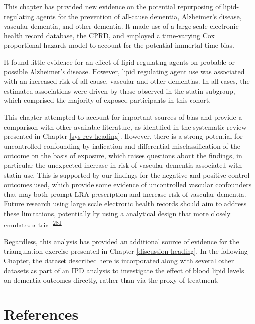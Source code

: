 \documentclass[a4paper, twoside]{templates/ociamthesis}
\begin{document}
This chapter has provided new evidence on the potential repurposing of lipid-regulating agents for the prevention of all-cause dementia, Alzheimer's disease, vascular dementia, and other dementia. It made use of a large scale electronic health record database, the CPRD, and employed a time-varying Cox proportional hazards model to account for the potential immortal time bias.

It found little evidence for an effect of lipid-regulating agents on probable or possible Alzheimer's disease. However, lipid regulating agent use was associated with an increased risk of all-cause, vascular and other dementias. In all cases, the estimated associations were driven by those observed in the statin subgroup, which comprised the majority of exposed participants in this cohort.

This chapter attempted to account for important sources of bias and provide a comparison with other available literature, as identified in the systematic review presented in Chapter \ref{sys-rev-heading}. However, there is a strong potential for uncontrolled confounding by indication and differential misclassification of the outcome on the basis of exposure, which raises questions about the findings, in particular the unexpected increase in risk of vascular dementia associated with statin use. This is supported by our findings for the negative and positive control outcomes used, which provide some evidence of uncontrolled vascular confounders that may both prompt LRA prescription and increase risk of vascular dementia. Future research using large scale electronic health records should aim to address these limitations, potentially by using a analytical design that more closely emulates a trial.\textsuperscript{\protect\hyperlink{ref-danaei2013b}{281}}

Regardless, this analysis has provided an additional source of evidence for the triangulation exercise presented in Chapter \ref{discussion-heading}. In the following Chapter, the dataset described here is incorporated along with several other datasets as part of an IPD analysis to investigate the effect of blood lipid levels on dementia outcomes directly, rather than via the proxy of treatment.

\newpage

\hypertarget{references-3}{%
\section{References}\label{references-3}}
\end{document}
